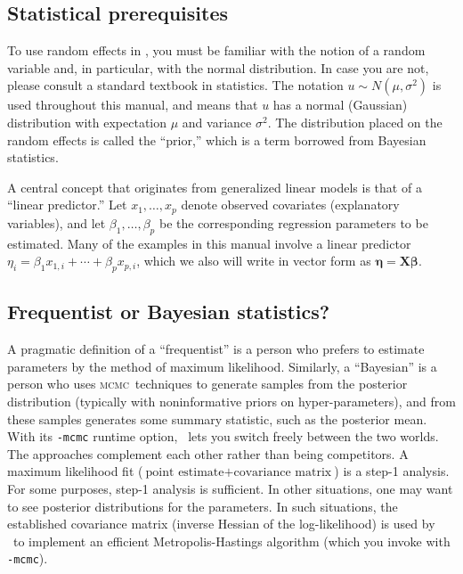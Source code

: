 \documentclass{admbmanual}
\newcommand{\scMCMC}{\textsc{mcmc}}
\begin{document}
\subsection{Statistical prerequisites}

To use random effects in \scAB, you must be familiar with the notion of a random
variable and, in particular, with the normal distribution. In case you are not,
please consult a standard textbook in statistics. The notation $u\sim N(\mu
,\sigma ^{2})$ is used throughout this manual, and means that $u$ has a normal
(Gaussian) distribution with expectation $\mu$ and variance $\sigma ^{2}$. The
distribution placed on the random effects is called the ``prior,'' which is a
term borrowed from Bayesian statistics.

A central concept that originates from generalized linear models is that of a
``linear predictor.'' Let $x_{1},\ldots ,x_{p}$ denote observed covariates
(explanatory variables), and let $\beta _{1},\ldots ,\beta _{p}$ be the
corresponding regression parameters to be estimated. Many of the examples in
this manual involve a linear predictor $\eta_{i}=\beta_{1}x_{1,i}+\cdots
+\beta_{p}x_{p,i}$, which we also will write in vector form as
$\mathbf{\eta}=\mathbf{X\beta }$. 

\subsection{Frequentist or Bayesian statistics?}

A pragmatic definition of a ``frequentist'' is a person who prefers to estimate
parameters by the method of maximum likelihood. Similarly, a ``Bayesian'' is a
person who uses \scMCMC\ techniques to generate samples from the posterior
distribution (typically with noninformative priors on hyper-parameters), and
from these samples generates some summary statistic, such as the posterior mean.
With its \texttt{-mcmc} runtime option, \scAB\ lets you switch freely between
the two worlds. The approaches complement each other rather than being
competitors. A maximum likelihood fit ($\textrm{point estimate} +
\textrm{covariance matrix}$) is a step-1 analysis. For some purposes, step-1
analysis is sufficient. In other situations, one may want to see posterior
distributions for the parameters. In such situations, the established covariance
matrix (inverse Hessian of the log-likelihood) is used by \scAB\ to implement an
efficient Metropolis-Hastings algorithm (which you invoke with \texttt{-mcmc}).
\end{document}
